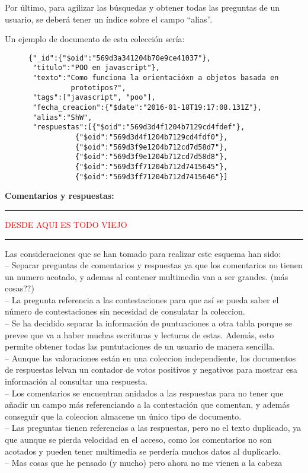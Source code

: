 \documentclass[11pt,a4paper]{article}
\begin{document}
Por último, para agilizar las búsquedas y obtener todas las preguntas de un usuario, se
deberá tener un índice sobre el campo ``alias''.

Un ejemplo de documento de esta colección sería:
\begin{figure}[H]
  \centering
\begin{lstlisting}
{"_id":{"$oid":"569d3a341204b70e9ce41037"},
 "titulo":"POO en javascript"},
 "texto":"Como funciona la orientacióxn a objetos basada en 
          prototipos?",
 "tags":["javascript", "poo"],
 "fecha_creacion":{"$date":"2016-01-18T19:17:08.131Z"},
 "alias":"ShW",
 "respuestas":[{"$oid":"569d3d4f1204b7129cd4fdef"},
	       {"$oid":"569d3d4f1204b7129cd4fdf0"},
	       {"$oid":"569d3f9e1204b712cd7d58d7"},
	       {"$oid":"569d3f9e1204b712cd7d58d8"},
	       {"$oid":"569d3ff71204b712d7415645"},
	       {"$oid":"569d3ff71204b712d7415646"}]
\end{lstlisting}
\end{figure}


\textbf{Comentarios y respuestas:}



\vspace{2cm}
\hrule
\begin{center}\textcolor{red}{DESDE AQUI ES TODO VIEJO}\end{center}
\hrule
\vspace{2cm}

Las consideraciones que se han tomado para realizar este esquema han sido:\\

-- Separar preguntas de comentarios y respuestas ya que los comentarios no
tienen un numero acotado, y ademas al contener multimedia van a ser
grandes. (más cosas??)\\
-- La pregunta referencia a las contestaciones para que así se pueda saber
el número de contestaciones sin necesidad de consulatar la coleccion.\\
-- Se ha decidido separar la información de puntuaciones a otra tabla
porque se prevee que va a haber muchas escrituras y lecturas de
estas. Además, esto permite obtener todas las puntutaciones de un usuario
de manera sencilla.\\
-- Aunque las valoraciones están en una coleccion independiente, los
documentos de respuestas lelvan un contador de votos positivos y negativos
para mostrar esa información al consultar una respuesta.\\
-- Los comentarios se encuentran anidados a las respuestas para no tener
que añadir un campo más referenciando a la contestación que comentan, y
además conseguir que la coleccion almacene un único tipo de documento.\\
-- Las preguntas tienen referencias a las respuestas, pero no el texto
duplicado, ya que aunque se pierda velocidad en el acceso, como los
comentarios no son acotados y pueden tener multimedia se perdería muchos
datos al duplicarlo.\\
-- Mas cosas que he pensado (y mucho) pero ahora no me vienen a la cabeza\\
\end{document}
